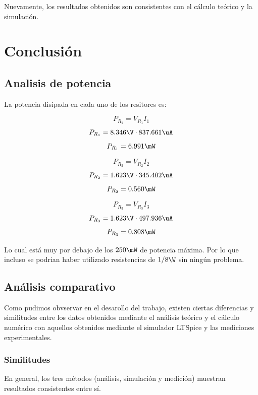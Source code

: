 \documentclass[]{informeutn}
\begin{document}
Nuevamente, los resultados obtenidos son consistentes con el cálculo teórico y la simulación.

\chapter{Conclusión}

\section{Analisis de potencia}
La potencia disipada en cada uno de los resitores es:

\newcommand{\PRa}{6.991\mW}
\newcommand{\PRb}{0.560\mW}
\newcommand{\PRc}{0.808\mW}

\begin{minipage}[t][][c]{0.3\textwidth}
  $$P_{R_1} = V_{R_1}I_1$$
  $$P_{R_1} = \VRa\cdot\Ia$$
  $$P_{R_1} = \PRa$$
\end{minipage}
\hfill
\begin{minipage}[t][][c]{0.3\textwidth}
  $$P_{R_2} = V_{R_2}I_2$$
  $$P_{R_2} = \VRb\cdot\Ib$$
  $$P_{R_2} = \PRb$$
\end{minipage}
\hfill
\begin{minipage}[t][][c]{0.3\textwidth}
  $$P_{R_3} = V_{R_3}I_3$$
  $$P_{R_3} = \VRc\cdot\Ic$$
  $$P_{R_3} = \PRc$$
\end{minipage}
\vspace{0.5cm}

Lo cual está muy por debajo de los $250\mW$ de potencia máxima. Por lo que incluso se podrian haber utilizado resistencias
de $1/8\W$ sin ningún problema.

\section{Análisis comparativo}

Como pudimos obvservar en el desarollo del trabajo, existen ciertas diferencias y similitudes entre los datos obtenidos
mediante el análisis teórico y el cálculo numérico con aquellos obtenidos mediante el simulador LTSpice y las mediciones
experimentales.

\subsection*{Similitudes}

En general, los tres métodos (análisis, simulación y medición) muestran resultados consistentes entre sí.
\end{document}
